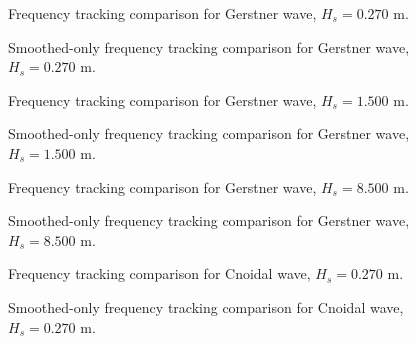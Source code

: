 \documentclass[11pt,letterpaper]{article}
\begin{document}
\begin{figure}[H]\centering
  \resizebox{\textwidth}{!}{}
  \caption{Frequency tracking comparison for Gerstner wave, $H_s = 0.270$ m.}
  \label{fig:freqtrack_gerstner_low}
\end{figure}
\begin{figure}[H]\centering
  \resizebox{\textwidth}{!}{}
  \caption{Smoothed-only frequency tracking comparison for Gerstner wave, $H_s = 0.270$ m.}
  \label{fig:freqtrack_gerstner_low_smooth}
\end{figure}

\begin{figure}[H]\centering
  \resizebox{\textwidth}{!}{}
  \caption{Frequency tracking comparison for Gerstner wave, $H_s = 1.500$ m.}
  \label{fig:freqtrack_gerstner_medium}
\end{figure}
\begin{figure}[H]\centering
  \resizebox{\textwidth}{!}{}
  \caption{Smoothed-only frequency tracking comparison for Gerstner wave, $H_s = 1.500$ m.}
  \label{fig:freqtrack_gerstner_medium_smooth}
\end{figure}

\begin{figure}[H]\centering
  \resizebox{\textwidth}{!}{}
  \caption{Frequency tracking comparison for Gerstner wave, $H_s = 8.500$ m.}
  \label{fig:freqtrack_gerstner_high}
\end{figure}
\begin{figure}[H]\centering
  \resizebox{\textwidth}{!}{}
  \caption{Smoothed-only frequency tracking comparison for Gerstner wave, $H_s = 8.500$ m.}
  \label{fig:freqtrack_gerstner_high_smooth}
\end{figure}

\begin{figure}[H]\centering
  \resizebox{\textwidth}{!}{}
  \caption{Frequency tracking comparison for Cnoidal wave, $H_s = 0.270$ m.}
  \label{fig:freqtrack_cnoidal_low}
\end{figure}
\begin{figure}[H]\centering
  \resizebox{\textwidth}{!}{}
  \caption{Smoothed-only frequency tracking comparison for Cnoidal wave, $H_s = 0.270$ m.}
  \label{fig:freqtrack_cnoidal_low_smooth}
\end{figure}
\end{document}
